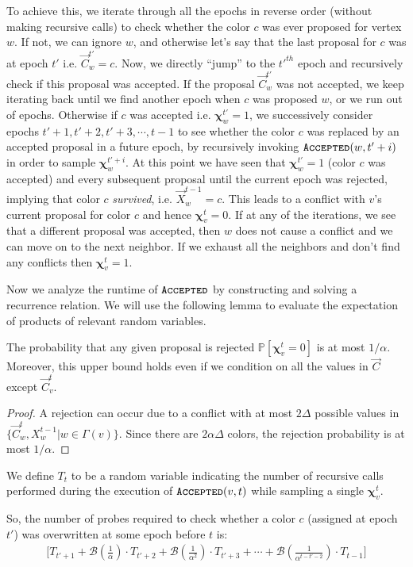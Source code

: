 To achieve this, we iterate through all the epochs in reverse order (without making recursive calls)
to check whether the color $c$ was ever proposed for vertex $w$.
If not, we can ignore $w$, and otherwise let's say that the last proposal for $c$ was at epoch $t'$ i.e. $\vec C^{t'}_w = c$.
Now, we directly ``jump'' to the $t'^{th}$ epoch and recursively check if this proposal was accepted.
If the proposal $\vec C^{t'}_w$ was not accepted, we keep iterating back until we find another epoch when $c$ was proposed $w$, or we run out of epochs.
Otherwise if $c$ was accepted i.e. $\bm\chi^{t'}_w = 1$,
we successively consider epochs $t'+1, t'+2, t'+3, \cdots, t-1$ to see whether the color $c$ was replaced by an accepted proposal in a future epoch,
by recursively invoking $\texttt{\textsc{Accepted}}(w,t'+i)$ in order to sample $\bm\chi^{t'+i}_w$.
At this point we have seen that $\bm\chi^{t'}_w = 1$ (color $c$ was accepted) and every subsequent proposal until the current epoch was rejected,
implying that color $c$ \emph{survived}, i.e. $\vec X^{t-1}_w = c$.
This leads to a conflict with $v$'s current proposal for color $c$ and hence $\bm\chi^t_v = 0$.
If at any of the iterations, we see that a different proposal was accepted, then $w$ does not cause a conflict and we can move on to the next neighbor.
If we exhaust all the neighbors and don't find any conflicts then $\bm\chi^t_v = 1$.

Now we analyze the runtime of $\texttt{\textsc{Accepted}}$ by constructing and solving a recurrence relation.
We will use the following lemma to evaluate the expectation of products of relevant random variables.

\begin{lemma}
\label{lem:color_reject_probability}
The probability that any given proposal is rejected $\mathbb P[\bm\chi^t_v=0]$ is at most $1/\alpha$.
Moreover, this upper bound holds even if we condition on all the values in $\vec C$ except $\vec C^t_v$.
\end{lemma}
\begin{proof}
A rejection can occur due to a conflict with at most $2\Delta$ possible values in $\{\vec C^t_w, X^{t-1}_w | w\in\Gamma(v)\}$.
Since there are $2\alpha\Delta$ colors, the rejection probability is at most $1/\alpha$.
\end{proof}

\begin{definition}
\label{def:coloring_recursions}
We define $T_t$ to be a random variable indicating the number of recursive calls performed during the execution of $\texttt{\textsc{Accepted}}(v,t)$
while sampling a single $\bm \chi_v^t$.
\end{definition}
So, the number of probes required to check whether a color $c$ (assigned at epoch $t'$) was overwritten at some epoch before $t$ is:
\begin{align}
\label{eq:color_overwrite}
\Biggl[T_{t'+1} + \mathcal B\left(\frac{1}{\alpha}\right)\cdot T_{t'+2}
+ \mathcal B\left(\frac{1}{\alpha^2}\right)\cdot T_{t'+3} + \cdots
+ \mathcal B\left(\frac{1}{\alpha^{t-t'-2}}\right)\cdot T_{t-1} \Biggr]
\end{align}

